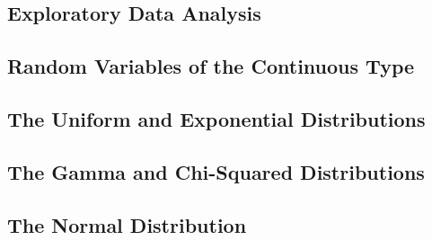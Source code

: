 \documentclass{article}
\begin{document}
\subsection{Exploratory Data Analysis}
\subsection{Random Variables of the Continuous Type}
\subsection{The Uniform and Exponential Distributions}
\subsection{The Gamma and Chi-Squared Distributions}
\subsection{The Normal Distribution}
\end{document}
